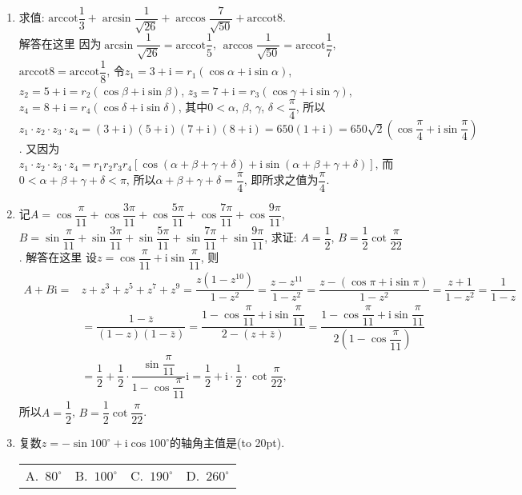\documentclass[10pt,a4paper]{article}
\newcommand{\bracket}[1]{(\hbox to #1pt{})}
\newcommand{\fourch}[4]{\par\begin{tabular}{p{.23\textwidth}p{.23\textwidth}p{.23\textwidth}p{.23\textwidth}}
A.~#1 &B.~#2& C.~#3& D.~#4
\end{tabular}}
\begin{document}
\begin{enumerate}[1.]
\begin{center}
\begin{tikzpicture}[>=latex,scale = 1.5]
    \end{tikzpicture}
\end{center}
\item 求值: $\mathrm{arccot} \dfrac 13+\arcsin \dfrac 1{\sqrt {26}}+\arccos \dfrac 7{\sqrt {50}}+\mathrm{arccot} 8$.\\
解答在这里  因为$\arcsin \dfrac 1{\sqrt {26}}=\mathrm{arccot} \dfrac 15$, $\arccos \dfrac 1{\sqrt {50}}=\mathrm{arccot} \dfrac 17$, $\mathrm{arccot} 8=\mathrm{arccot} \dfrac 18$,
令$z_1=3+\mathrm{i}=r_1(\cos \alpha +\mathrm{i}\sin \alpha)$, $z_2=5+\mathrm{i}=r_2(\cos \beta +\mathrm{i}\sin \beta)$,
$z_3=7+\mathrm{i}=r_3(\cos \gamma +\mathrm{i}\sin \gamma)$, $z_4=8+\mathrm{i}=r_4(\cos \delta +\mathrm{i}\sin \delta)$, 其中$0<\alpha$, $\beta$, $\gamma$, $\delta <\dfrac{\pi }4$,
所以$z_1\cdot z_2\cdot z_3\cdot z_4=(3+\mathrm{i})(5+\mathrm{i})(7+\mathrm{i})(8+\mathrm{i})=650(1+\mathrm{i})=650\sqrt 2(\cos \dfrac{\pi }4+\mathrm{i}\sin \dfrac{\pi }4)$.
又因为$z_1\cdot z_2\cdot z_3\cdot z_4=r_1r_2r_3r_4[\cos (\alpha +\beta +\gamma +\delta)+\mathrm{i}\sin (\alpha +\beta +\gamma +\delta)]$,
而$0<\alpha +\beta +\gamma +\delta <\pi$, 所以$\alpha +\beta +\gamma +\delta =\dfrac{\pi }4$, 即所求之值为$\dfrac{\pi }4$.
\item 记$A=\cos \dfrac{\pi }{11}+\cos \dfrac{3\pi }{11}+\cos \dfrac{5\pi }{11}+\cos \dfrac{7\pi }{11}+\cos \dfrac{9\pi }{11}$, $B=\sin \dfrac{\pi }{11}+\sin \dfrac{3\pi }{11}+\sin \dfrac{5\pi }{11}+\sin \dfrac{7\pi }{11}+\sin \dfrac{9\pi }{11}$, 求证: $A=\dfrac 12$, $B=\dfrac 12\cot \dfrac{\pi }{22}$.
解答在这里 设$z=\cos \dfrac{\pi }{11}+\mathrm{i}\sin \dfrac{\pi }{11}$, 则
\begin{align*}
    A+B\mathrm{i}=&z+z^3+z^5+z^7+z^9=\dfrac{z(1-z^{10})}{1-z^2}=\dfrac{z-z^{11}}{1-z^2}=\dfrac{z-(\cos \pi +\mathrm{i}\sin \pi)}{1-z^2}=\dfrac{z+1}{1-z^2}=\dfrac 1{1-z}\\
    &=\dfrac{1-\overline z}{(1-z)(1-\overline z)}=\dfrac{1-\cos \dfrac{\pi }{11}+\mathrm{i}\sin \dfrac{\pi }{11}}{2-(z+\overline z)}=\dfrac{1-\cos \dfrac{\pi }{11}+\mathrm{i}\sin \dfrac{\pi }{11}}{2(1-\cos \dfrac{\pi }{11})}\\
    &=\dfrac 12+\dfrac 12\cdot \dfrac{\sin \dfrac{\pi }{11}}{1-\cos \dfrac{\pi }{11}}\mathrm{i}=\dfrac 12+\mathrm{i}\cdot \dfrac 12\cdot \cot \dfrac{\pi }{22},
\end{align*}
所以$A=\dfrac 12$, $B=\dfrac 12\cot \dfrac{\pi }{22}$.
\item 复数$z=-\sin 100^\circ +\mathrm{i}\cos 100^\circ$的轴角主值是\bracket{20}.
\fourch{$80^\circ$}{$100^\circ$}{$190^\circ$}{$260^\circ$}

\end{enumerate}
\end{document}
